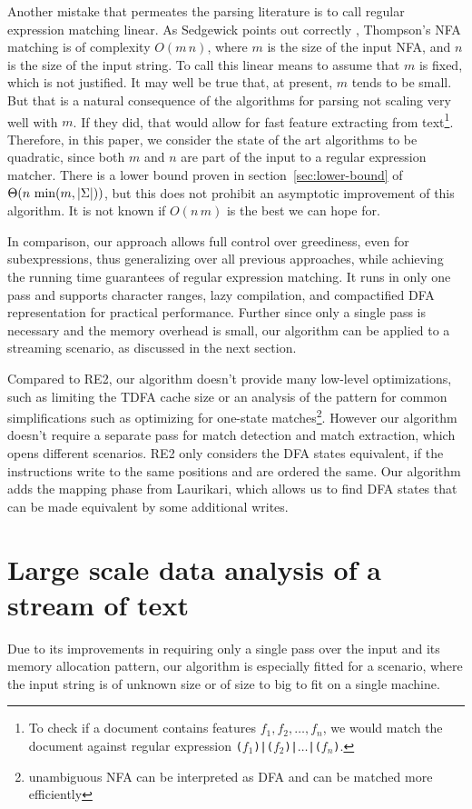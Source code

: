 \documentclass[11pt,a4paper,twoside,openright]{Thesis}
\theoremstyle{definition}
\newcommand{\Secref}[1]{section~\ref{sec:#1}}
\begin{document}
Another mistake that permeates the parsing literature is to call
regular expression matching linear. As Sedgewick points out correctly
\cite{Sedg90a}, Thompson's NFA matching is of complexity $O(m\, n)$,
where $m$ is the size of the input NFA, and $n$ is the size of the
input string. To call this linear means to assume that $m$ is fixed,
which is not justified. It may well be true that, at present, $m$
tends to be small. But that is a natural consequence of the algorithms for
parsing not scaling very well with $m$. If they did, that would allow for
fast feature extracting from text\footnote{To check if a document
contains features $f_1, f_2, \dots, f_n$, we would match the document
against regular expression \texttt{($f_1$)|($f_2$)|$\dots$|($f_n$)}.}.
Therefore, in this paper, we consider the state of the art algorithms
to be quadratic, since both $m$ and $n$ are part of the input to a
regular expression matcher. There is a lower bound proven in
\Secref{lower-bound} of $\Theta(n\, \min(m, \left|\Sigma\right|))$, but this does
not prohibit an asymptotic improvement of this algorithm. It is not known if
$O(n\, m)$ is the best we can hope for.

In comparison, our approach allows full control over greediness, even for
subexpressions, thus generalizing over all previous approaches, while achieving
the running time guarantees of regular expression matching. It runs in only one
pass and supports character ranges, lazy compilation, and compactified DFA
representation for practical performance. Further since only a single pass is
necessary and the memory overhead is small, our algorithm can be applied to a
streaming scenario, as discussed in the next section.

Compared to \textsc{RE2}, our algorithm doesn't provide many low-level optimizations,
such as limiting the TDFA cache size or an analysis of the pattern for common
simplifications such as optimizing for one-state matches\footnote{unambiguous
NFA can be interpreted as DFA and can be matched more efficiently}. However
our algorithm doesn't require a separate pass for match detection and match
extraction, which opens different scenarios. \textsc{RE2} only considers the
DFA states equivalent, if the instructions write to the same positions and are
ordered the same. Our algorithm adds the mapping phase from Laurikari, which 
allows us to find DFA states that can be made equivalent by some additional writes.

\section{Large scale data analysis of a stream of text}\label{sec:stream}
Due to its improvements in requiring only a single pass over the input and
its memory allocation pattern, our algorithm is especially fitted for a
scenario, where the input string is of unknown size or of size to big to fit
on a single machine.
\end{document}
